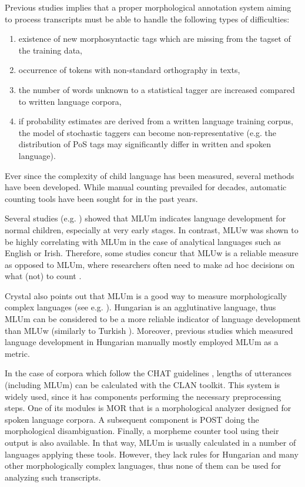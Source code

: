 Previous studies implies that a proper morphological annotation system aiming to process transcripts must be able to handle the following types of difficulties:
\begin{enumerate}
 \item existence of new morphosyntactic tags which are missing from the tagset of the training data,
 \item occurrence of tokens with non-standard orthography in texts,
 \item the number of words unknown to a statistical tagger are increased compared to written language corpora,
 \item if probability estimates are derived from a written language training corpus, the model of stochastic taggers can become non-representative (e.g. the distribution of PoS tags may significantly differ in written and spoken language).
\end{enumerate}

Ever since the complexity of child language has been measured, several methods have been developed. While manual counting prevailed for decades, automatic counting tools have been sought for in the past years.

Several studies (e.g. \cite{Brown1973}) showed that MLUm indicates language development for normal children, especially at very early stages. 
In contrast, MLUw was shown to be highly correlating \cite{Hickey1991,Parker2005} with MLUm in the case of analytical languages such as English or Irish. 
Therefore, some studies concur that MLUw is a reliable measure as opposed to MLUm, where researchers often need to make ad hoc decisions on what (not) to count \cite{Crystal1974}. 

Crystal also points out \cite{Crystal1974} that MLUm is a good way to measure morphologically complex languages (see e.g. \cite{Bowerman1973}). 
Hungarian is an agglutinative language, thus MLUm can be considered to be a more reliable indicator of language development  than MLUw (similarly to Turkish \cite{saygin2010}). 
Moreover, previous studies which measured language development in Hungarian manually \cite{Reger1990,Weber2011} mostly employed MLUm as a metric.

In the case of corpora which follow the CHAT guidelines \cite{macwhinney1991childes}, lengths of utterances (including MLUm) can be calculated with the CLAN \cite{MacWhinney1992} toolkit. 
This system is widely used, since it has components performing the necessary preprocessing steps. 
One of its modules is MOR that is a morphological analyzer designed for spoken language corpora. 
A subsequent component is POST doing the morphological disambiguation. 
Finally, a morpheme counter tool using their output is also available. 
In that way, MLUm is usually calculated in a number of languages applying these tools.
However, they lack rules for Hungarian and many other morphologically complex languages, thus none of them can be used for analyzing such transcripts.


